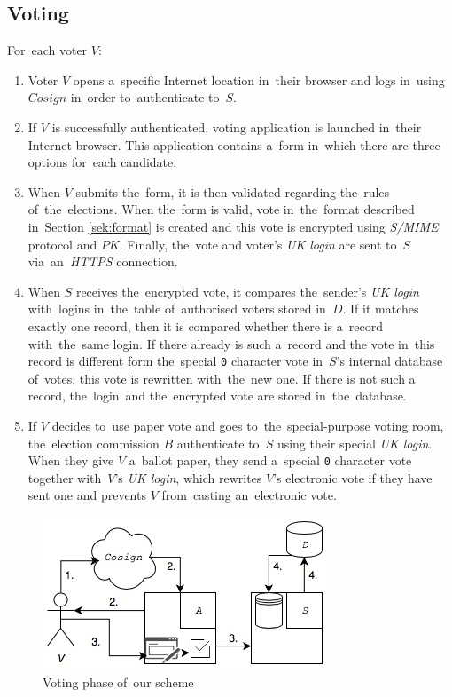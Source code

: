 \subsection{Voting}
For~each voter $V$:
\begin{enumerate}
\item Voter $V$ opens a~specific Internet location in~their browser and logs in~using $Cosign$ in~order to~authenticate to~$S$.
\item If $V$ is successfully authenticated, voting application is launched in~their Internet browser. This application contains a~form in~which there are three options for~each candidate.
\item When $V$ submits the~form, it is then validated regarding the~rules of~the~elections. When the~form is valid, vote in~the~format described in~Section \ref{sek:format} is created and this vote is encrypted using \emph{S/MIME} protocol and $PK$. Finally, the~vote and voter's \emph{UK login} are sent to~$S$ via~an~\emph{HTTPS} connection.
\item When $S$ receives the~encrypted vote, it compares the~sender's \emph{UK login} with~logins in~the~table of~authorised voters stored in~$D$. If it matches exactly one record, then it is compared whether there is a~record with~the~same login. If there already is such a~record and the vote in~this record is different form the~special \texttt{0} character vote in~$S$'s internal database of~votes, this vote is rewritten with~the~new one. If there is not such a record, the~login~and the~encrypted vote are stored in~the~database.
\item If $V$ decides to~use paper vote and goes to~the~special-purpose voting room, the~election commission $B$ authenticate to~$S$ using their special \emph{UK login}. When they give $V$ a~ballot paper, they send a~special \texttt{0} character vote together with~$V$'s \emph{UK login}, which rewrites $V$'s electronic vote if they have sent one and prevents $V$ from~casting an~electronic vote.
\end{enumerate}

\begin{figure}
\begin{center}
\includegraphics[scale=0.9]{images/Voting1}
\caption{Voting phase of~our scheme}
\end{center}
\end{figure}

